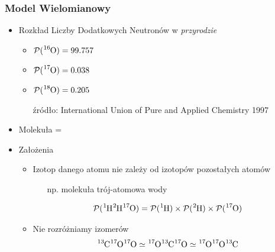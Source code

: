 \documentclass[xetex]{beamer}
\begin{document}
	\begin{frame}\frametitle{Model Wielomianowy}

		\begin{itemize}
			\item Rozkład Liczby Dodatkowych Neutronów w {\it przyrodzie}
			\begin{itemize}
				\item $\prob( \cem{^{16}O} ) = 99.757$
				\item $\prob( \cem{^{17}O} ) = 0.038$
				\item $\prob( \cem{^{18}O} ) = 0.205$
				\item[źródło:] \textcolor{adriatico}{I}nternational \textcolor{adriatico}{U}nion of \textcolor{adriatico}{P}ure and \textcolor{adriatico}{A}pplied \textcolor{adriatico}{C}hemistry 1997 
			\end{itemize}
			\item Molekuła = \molecule
			\item Założenia
			\begin{itemize}
				\item 	Izotop danego atomu \molecule nie zależy od izotopów pozostałych atomów
				\begin{itemize}
					\item[np.]  molekuła trój-atomowa wody 
				\end{itemize}				  
				$$\prob( \cem{^{1}H ^{2}H ^{17}O} ) = 
					\prob( \cem{^{1}H} ) \times \prob( \cem{^{2}H} ) \times \prob( \cem{ ^{17}O} ) $$
				\item 	Nie rozróżniamy izomerów
				$$ \cem{^{13}C ^{17}O ^{17}O} \simeq \cem{^{17}O ^{13}C ^{17}O} \simeq \cem{ ^{17}O ^{17}O ^{13}C }$$	
			\end{itemize}
		\end{itemize}

	\end{frame}
\end{document}
